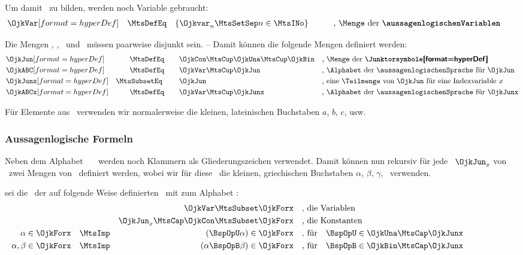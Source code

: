 {Um damit \Formeln\ zu bilden, werden noch Variable gebraucht:
\begin{align}
& \defSym{\OjkVar}  & \MtsDefEq \quad & \MengeDef{\Ojkvar_n}{n \in \MtsINo}
&&&&
&& \text{, \Menge\ der \defFt{\aussagenlogischenVariablen}} \label{def:OjkVar}
&&
\end{align}

Die Mengen \OjkCon, \OjkUna, \OjkBin\ und \OjkVar\ müssen paarweise disjunkt sein.
-- Damit können die folgende Mengen definiert werden:
\begin{align}
& \defSym{\OjkJun}  & \MtsDefEq      \qquad & \OjkCon \MtsCup \OjkUna \MtsCup \OjkBin
&& \text{, \Menge\ der \defTxt{\Junktorsymbole}}
\label{def:OjkJun}
\\
& \defSym{\OjkABC}  & \MtsDefEq      \qquad & \OjkVar \MtsCup \OjkJun
&& \text{, \Alphabet\ der \aussagenlogischenSprache\ für } \OjkJun
\label{def:OjkABC}
\\
& \defSym{\OjkJunx} & \MtsSubsetEq\; \qquad & \OjkJun
&& \text{, eine \Teilmenge\ von } \OjkJun \text{ für eine Indexvariable } x
\label{def:OjkJunx}
\\
& \defSym{\OjkABCx} & \MtsDefEq      \qquad & \OjkVar \MtsCup \OjkJunx \quad
&& \text{, \Alphabet\ der \aussagenlogischenSprache\ für } \OjkJunx
\label{def:OjkABCx}
\end{align}

Für Elemente aus \OjkVar\ verwenden wir normalerweise die kleinen, lateinischen Buchstaben $a$, $b$, $c$, usw.

\subsubsection{Aussagenlogische Formeln}%
\label                  {subsub:Formeln}

Neben dem Alphabet \OjkABC\ \textbzw\ \OjkABCx\ werden noch Klammern als Gliederungszeichen verwendet.
Damit können nun rekursiv für jede \Teilmenge\ $\OjkJun_x$ von \OjkJun\ zwei Mengen von \aussagenlogischenFormeln\ definiert werden, wobei wir für diese \Formeln\ die kleinen, griechischen Buchstaben $\alpha$, $\beta$, $\gamma$, \textusw\ verwenden.

 sei die \Menge\ der auf folgende Weise definierten \ mit  zum Alphabet :
\begin{align}
&                    & \OjkVar                    \MtsSubset \OjkForx
&&& \text{, die Variablen}  \label{def:ForQ}
\\
&                    & \OjkJun_x \MtsCap \OjkCon   \MtsSubset \OjkForx
&&& \text{, die Konstanten} \label{def:ForJK}
\\
\alpha \in\OjkForx & \quad\MtsImp & (\BspOpU\alpha)\in\OjkForx
&&& \text{, für} \quad \BspOpU \in \OjkUna \MtsCap \OjkJunx
\label{def:ForU}
\\
\alpha,\beta\in\OjkForx & \quad\MtsImp & (\alpha\BspOpB\beta) \in\OjkForx
&&& \text{, für} \quad \BspOpB  \in \OjkBin \MtsCap \OjkJunx
\label{def:ForB}
\formulatoleft
\end{align}

}
